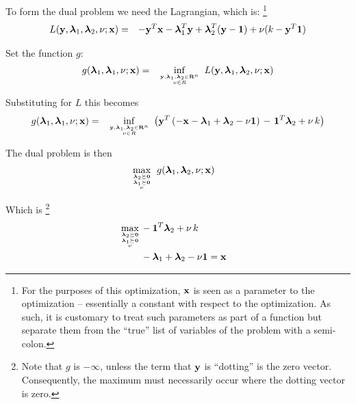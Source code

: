 \documentclass[12pt]{article}
\begin{document}
To form the dual problem we need the Lagrangian, which is:%
\footnote{For the purposes of this optimization, ${\bf x}$ is seen as a parameter
to the optimization -- essentially a constant with respect to the optimization.
As such, it is customary to treat such parameters as part of a function but separate
them from the ``true'' list of variables of the problem with a semi-colon.}
\begin{eqnarray}
	L({\bf y}, {\boldsymbol \lambda}_1, {\boldsymbol \lambda}_2, \nu; {\bf x}) &=& 
	-{\bf y}^T {\bf x} - {\boldsymbol \lambda}_1^T {\bf y} + {\boldsymbol \lambda}_2^T ({\bf y} - {\bf 1}) + \nu (k - {\bf y}^T {\bf 1}) 
\end{eqnarray}

Set the function $g$:
\begin{eqnarray}
	g({\boldsymbol \lambda}_1, {\boldsymbol \lambda}_1, \nu; {\bf x}) &=& 
		\mathop{\rm inf}_{{{\bf y}, {\boldsymbol \lambda}_1, {\boldsymbol \lambda}_2 \in {\bf R}^n} \atop \nu \in R} 
		\; L({\bf y}, {\boldsymbol \lambda}_1, {\boldsymbol \lambda}_2, \nu; {\bf x}) 
\end{eqnarray}

Substituting for $L$ this becomes
\begin{eqnarray}
	g({\boldsymbol \lambda}_1, {\boldsymbol \lambda}_1, \nu; {\bf x}) &=& 
		\mathop{\rm inf}_{{{\bf y}, {\boldsymbol \lambda}_1, {\boldsymbol \lambda}_2 \in {\bf R}^n} \atop \nu \in R} 
		\; \left({\bf y}^T \left( -{\bf x} - {\boldsymbol \lambda}_1 + {\boldsymbol \lambda}_2 - \nu {\bf 1} \right) \right.
		- \left. {\bf 1}^T {\boldsymbol \lambda}_2 + \nu \, k  \right)
\end{eqnarray}

The dual problem is then
\begin{eqnarray}
	\mathop{\rm max}_{{{\boldsymbol \lambda}_2 \succeq {\bf 0}} \atop {{{\boldsymbol \lambda}_1 \succeq {\bf 0}} \atop \nu}} 
		\; g({\boldsymbol \lambda}_1, {\boldsymbol \lambda}_2, \nu; {\bf x}) & & 
\end{eqnarray}

Which is%
\footnote{Note that $g$ is $-\infty$, unless the term that ${\bf y}$ is ``dotting'' is the zero vector. Consequently, the maximum
must necessarily occur where the dotting vector is zero.}
\begin{eqnarray}
	\mathop{\rm max}_{{{\boldsymbol \lambda}_2 \succeq {\bf 0}} \atop {{{\boldsymbol \lambda}_1 \succeq {\bf 0}} \atop \nu}} 
		 & - {\bf 1}^T {\boldsymbol \lambda}_2 + \nu \, k   & \\ 
		 & - {\boldsymbol \lambda}_1 + {\boldsymbol \lambda}_2 - \nu {\bf 1} = {\bf x} & 
\end{eqnarray}
\end{document}
